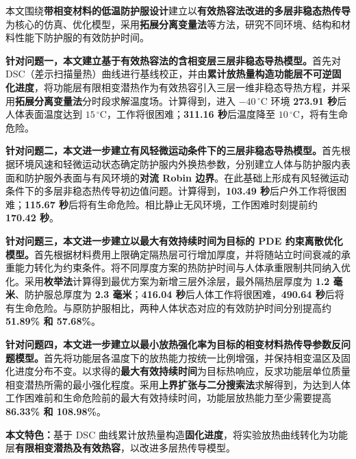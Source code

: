 本文围绕\textbf{带相变材料的低温防护服设计}建立以\textbf{有效热容法改进的多层非稳态热传导}为核心的仿真、优化模型，采用\textbf{拓展分离变量法}等方法，研究不同环境、结构和材料性能下防护服的有效防护时间。

\textbf{针对问题一，本文建立基于有效热容法的含相变层三层非稳态导热模型。}首先对 DSC（差示扫描量热）曲线进行基线校正，并由\textbf{累计放热量构造功能层不可逆固化进度}，将功能层有限相变潜热作为有效热容引入三层一维非稳态导热方程，并采用\textbf{拓展分离变量法}分时段求解温度场。计算得到，进入 $-40\,^{\circ}\mathrm C$ 环境 \textbf{273.91 秒}后人体表面温度达到 \textbf{$15\,^{\circ}\mathrm C$}，工作将很困难；\textbf{311.16 秒}后温度降至 \textbf{$10\,^{\circ}\mathrm C$}，将有生命危险。

\textbf{针对问题二，本文进一步建立有风轻微运动条件下的三层非稳态导热模型。}首先根据环境风速和轻微运动状态确定防护服内外换热参数，分别建立人体与防护服内表面和防护服外表面与有风环境的\textbf{对流 Robin 边界}。在此基础上形成有风轻微运动条件下的多层非稳态热传导初边值问题。计算得到，\textbf{103.49 秒}后户外工作将很困难；\textbf{115.67 秒}后将有生命危险。相比静止无风环境，工作困难时刻提前约 \textbf{170.42 秒}。

\textbf{针对问题三，本文进一步建立以最大有效持续时间为目标的 PDE 约束离散优化模型。}首先根据材料费用上限确定隔热层可行增加厚度，并将随站立时间衰减的承重能力转化为约束条件。将不同厚度方案的热防护时间与人体承重限制共同纳入优化。采用\textbf{枚举法}计算得到最优方案为新增三层外涂层，最外隔热层厚度为 \textbf{1.2 毫米}、防护服总厚度为 \textbf{2.3 毫米}；\textbf{416.04 秒}后人体工作将很困难，\textbf{490.64 秒}后将有生命危险。与原防护服相比，两种人体状态对应的有效防护时间分别提高约 \textbf{51.89\% 和 57.68\%}。

\textbf{针对问题四，本文进一步建立以最小放热强化率为目标的相变材料热传导参数反问题模型。}首先将功能层各温度下的放热能力按统一比例增强，并保持相变温区及固化进度分布不变。以求得的\textbf{最大有效持续时间}为目标热响应，反求功能层单位质量相变潜热所需的最小强化程度。采用\textbf{上界扩张与二分搜索法}求解得到，为达到人体工作困难前和生命危险前的最大有效持续时间，功能层放热能力至少需要提高 \textbf{86.33\% 和 108.98\%}。

\textbf{本文特色：}基于 DSC 曲线累计放热量构造\textbf{固化进度}，将实验放热曲线转化为功能层\textbf{有限相变潜热及有效热容}，以改进多层热传导模型。

